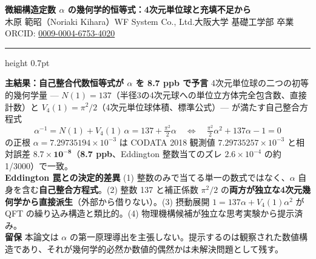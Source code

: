 \documentclass[9pt,a4paper]{ltjsarticle}
\begin{document}
\begin{center}
{\Large\bfseries 微細構造定数 $\alpha$ の幾何学的恒等式：4次元単位球と充填不足から}\\[2pt]
{\small 木原 範昭（Noriaki Kihara）\enspace WF System Co., Ltd.\enspace 大阪大学 基礎工学部 卒業\enspace ORCID: \href{https://orcid.org/0009-0004-6753-4020}{0009-0004-6753-4020}}
\end{center}

\vspace{-1pt}
\hrule height 0.7pt
\vspace{4pt}

\begin{tcolorbox}[colback=gray!7,colframe=gray!55,boxrule=0.4pt,arc=2pt,left=4pt,right=4pt,top=2pt,bottom=2pt]
{\small
\textbf{主結果：自己整合代数恒等式が $\alpha$ を \textbf{8.7 ppb} で予言}\enspace
4次元単位球の二つの初等的幾何学量 — $N(1) = 137$（半径3の4次元球への単位立方体完全包含数、直接計数）と $V_4(1) = \pi^2/2$（4次元単位球体積、標準公式）— が満たす自己整合方程式
\[ \alpha^{-1} = N(1) + V_4(1)\,\alpha = 137 + \tfrac{\pi^2}{2}\alpha \quad\Longleftrightarrow\quad \tfrac{\pi^2}{2}\alpha^2 + 137\alpha - 1 = 0 \]
の正根 $\alpha = 7.29735194\times 10^{-3}$ は CODATA 2018 観測値 $7.29735257\times 10^{-3}$ と相対誤差 $\mathbf{8.7 \times 10^{-8}}$（\textbf{8.7 ppb}、Eddington 整数当てのズレ $2.6\times 10^{-4}$ の約 1/3000）で一致。\\[2pt]
\textbf{Eddington 罠との決定的差異}\enspace
(1) 整数のみで当てる単一の数式ではなく、$\alpha$ 自身を含む\textbf{自己整合方程式}。(2) 整数 137 と補正係数 $\pi^2/2$ の\textbf{両方が独立な4次元幾何学から直接派生}（外部から借りない）。(3) 摂動展開 $1 = 137\alpha + V_4(1)\alpha^2$ が QFT の繰り込み構造と類比的。(4) 物理機構候補が独立な思考実験から提示済み。\\[2pt]
\textbf{留保}\enspace
本論文は $\alpha$ の第一原理導出を主張しない。提示するのは観察された数値構造であり、それが幾何学的必然か数値的偶然かは未解決問題として残す。}
\end{tcolorbox}

\vspace{2pt}
\end{document}
